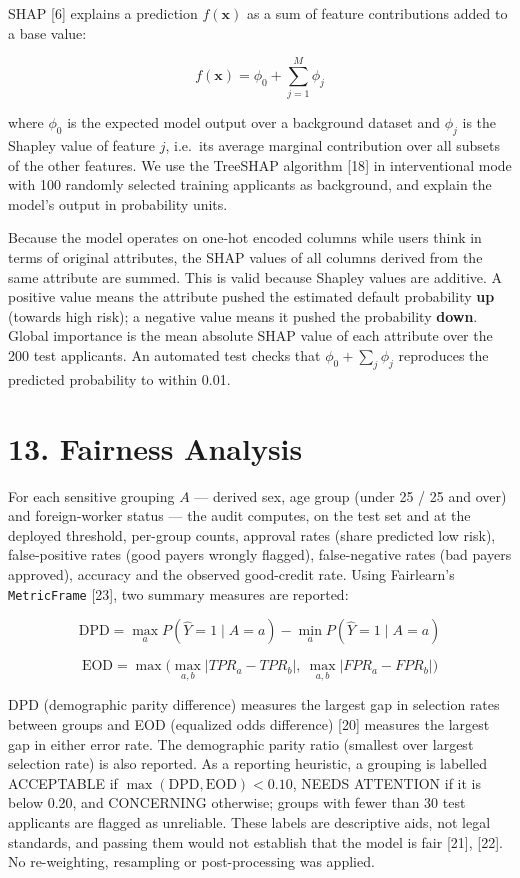 \documentclass[
  11pt,
]{article}
\begin{document}
SHAP {[}6{]} explains a prediction \(f(\mathbf{x})\) as a sum of feature
contributions added to a base value:

\[f(\mathbf{x}) = \phi_0 + \sum_{j=1}^{M} \phi_j\]

where \(\phi_0\) is the expected model output over a background dataset
and \(\phi_j\) is the Shapley value of feature \(j\), i.e.~its average
marginal contribution over all subsets of the other features. We use the
TreeSHAP algorithm {[}18{]} in interventional mode with 100 randomly
selected training applicants as background, and explain the model's
output in probability units.

Because the model operates on one-hot encoded columns while users think
in terms of original attributes, the SHAP values of all columns derived
from the same attribute are summed. This is valid because Shapley values
are additive. A positive value means the attribute pushed the estimated
default probability \textbf{up} (towards high risk); a negative value
means it pushed the probability \textbf{down}. Global importance is the
mean absolute SHAP value of each attribute over the 200 test applicants.
An automated test checks that \(\phi_0 + \sum_j \phi_j\) reproduces the
predicted probability to within 0.01.

\hypertarget{fairness-analysis}{%
\section{13. Fairness Analysis}\label{fairness-analysis}}

For each sensitive grouping \(A\) --- derived sex, age group (under 25 /
25 and over) and foreign-worker status --- the audit computes, on the
test set and at the deployed threshold, per-group counts, approval rates
(share predicted low risk), false-positive rates (good payers wrongly
flagged), false-negative rates (bad payers approved), accuracy and the
observed good-credit rate. Using Fairlearn's \texttt{MetricFrame}
{[}23{]}, two summary measures are reported:

\[\text{DPD} = \max_{a} P(\hat{Y}=1 \mid A=a) - \min_{a} P(\hat{Y}=1 \mid A=a)\]

\[\text{EOD} = \max\Big(\max_{a,b}\big|TPR_a - TPR_b\big|,\ \max_{a,b}\big|FPR_a - FPR_b\big|\Big)\]

DPD (demographic parity difference) measures the largest gap in
selection rates between groups and EOD (equalized odds difference)
{[}20{]} measures the largest gap in either error rate. The demographic
parity ratio (smallest over largest selection rate) is also reported. As
a reporting heuristic, a grouping is labelled ACCEPTABLE if
\(\max(\text{DPD}, \text{EOD}) < 0.10\), NEEDS ATTENTION if it is below
0.20, and CONCERNING otherwise; groups with fewer than 30 test
applicants are flagged as unreliable. These labels are descriptive aids,
not legal standards, and passing them would not establish that the model
is fair {[}21{]}, {[}22{]}. No re-weighting, resampling or
post-processing was applied.
\end{document}
